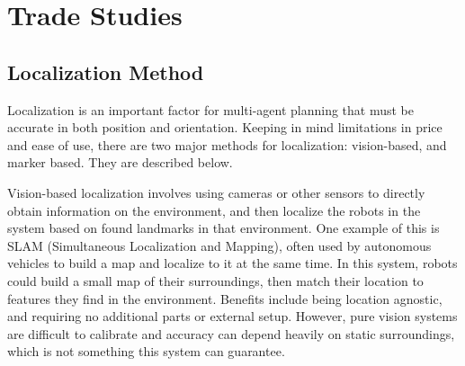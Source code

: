 
\section{Trade Studies}
\label{sec:trade_studies}



\subsection{Localization Method}
\label{sec:trade_localization}
Localization is an important factor for multi-agent planning that must be accurate in both position and orientation. Keeping in mind limitations in price and ease of use, there are two major methods for localization: vision-based, and marker based. They are described below.

Vision-based localization involves using cameras or other sensors to directly obtain information on the environment, and then localize the robots in the system based on found landmarks in that environment. One example of this is SLAM (Simultaneous Localization and Mapping), often used by autonomous vehicles to build a map and localize to it at the same time. In this system, robots could build a small map of their surroundings, then match their location to features they find in the environment. Benefits include being location agnostic, and requiring no additional parts or external setup. However, pure vision systems are difficult to calibrate and accuracy can depend heavily on static surroundings, which is not something this system can guarantee.

